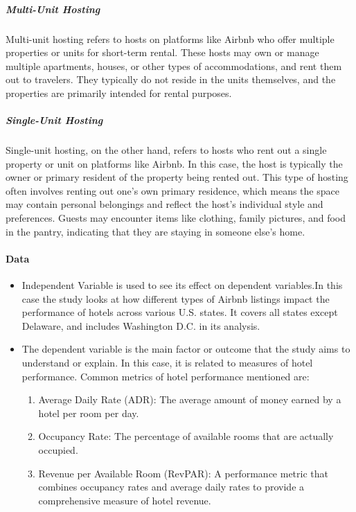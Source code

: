 \documentclass[12pt]{article}
\begin{document}
\subparagraph{Multi-Unit Hosting}
Multi-unit hosting refers to hosts on platforms like Airbnb who offer multiple properties or units for short-term rental. These hosts may own or manage multiple apartments, houses, or other types of accommodations, and rent them out to travelers. They typically do not reside in the units themselves, and the properties are primarily intended for rental purposes.

\subparagraph{Single-Unit Hosting}
Single-unit hosting, on the other hand, refers to hosts who rent out a single property or unit on platforms like Airbnb. In this case, the host is typically the owner or primary resident of the property being rented out. This type of hosting often involves renting out one's own primary residence, which means the space may contain personal belongings and reflect the host's individual style and preferences. Guests may encounter items like clothing, family pictures, and food in the pantry, indicating that they are staying in someone else's home.

\paragraph{Data}

\begin{itemize}

\item Independent Variable is used to see its effect on dependent variables.In this case the study looks at how different types of Airbnb listings impact the performance of hotels across various U.S. states. It covers all states except Delaware, and includes Washington D.C. in its analysis.

\item The dependent variable is the main factor or outcome that the study aims to understand or explain. In this case, it is related to measures of hotel performance. Common metrics of hotel performance mentioned are:

\begin{enumerate}

 \item Average Daily Rate (ADR): The average amount of money earned by a hotel per room per day.
 \item Occupancy Rate: The percentage of available rooms that are actually occupied.
 \item Revenue per Available Room (RevPAR): A performance metric that combines occupancy rates and average daily rates to provide a comprehensive measure of hotel revenue.

\end{enumerate}
\end{itemize}
\end{document}
